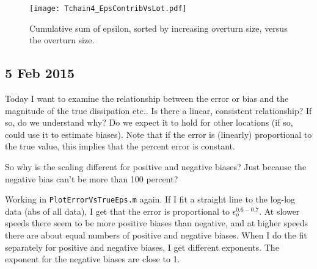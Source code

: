 \documentclass[11pt]{article}
\begin{document}
\begin{figure}[htbp]
\texttt{[image: Tchain4\_EpsContribVsLot.pdf]}
\caption{Cumulative sum of epsilon, sorted by increasing overturn size, versus the overturn size.}
\label{LepsContT4}
\end{figure}



\clearpage
\newpage
\subsection{5 Feb 2015}

Today I want to examine the relationship between the error or bias and the magnitude of the true dissipation etc.. Is there a linear, consistent relationship? If so, do we understand why? Do we expect it to hold for other locations (if so, could use it to estimate biases). Note that if the error is (linearly) proportional to the true value, this implies that the percent error is constant.

\vspace{1cm}

So why is the scaling different for positive and negative biases? Just because the negative bias can't be more than 100 percent?

\vspace{1cm}

Working in \verb+PlotErrorVsTrueEps.m+ again. If I fit a straight line to the log-log data (abs of all data), I get that the error is proportional to $\epsilon_{o}^{0.6-0.7}$. At slower speeds there seem to be more positive biases than negative, and at higher speeds there are about equal numbers of positive and negative biases. When I do the fit separately for positive and negative biases, I get different exponents. The exponent for the negative biases are close to 1.
\end{document}

